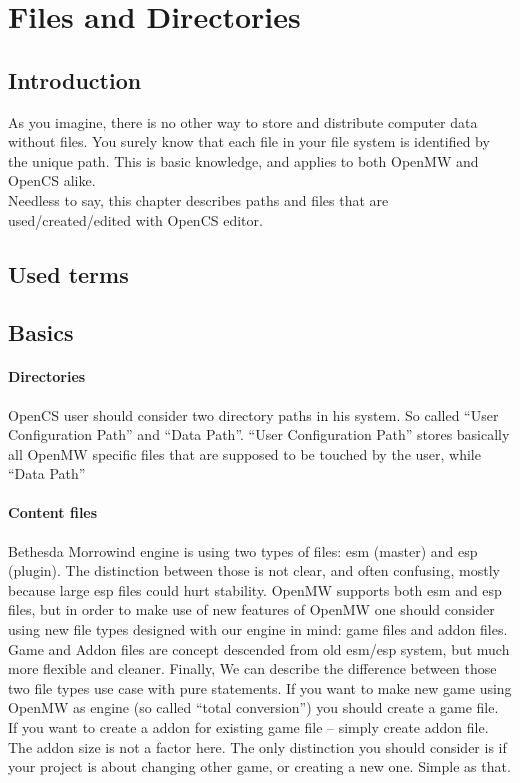 \section{Files and Directories}
\subsection{Introduction}
As you imagine, there is no other way to store and distribute computer data without files. You surely know that each file in your file system is identified by the unique path. This is basic knowledge, and applies to both Open{MW} and Open{CS} alike.\\

Needless to say, this chapter describes paths and files that are used/created/edited with OpenCS editor.\\

\subsection{Used terms} %

\subsection{Basics}

\paragraph{Directories}
Open{CS} user should consider two directory paths in his system. So called ``User Configuration Path'' and ``Data Path''. ``User Configuration Path'' stores basically all Open{MW} specific files that are supposed to be touched by the user, while ``Data Path''%

\paragraph{Content files}
Bethesda Morrowind engine is using two types of files: esm (master) and esp (plugin). The distinction between those is not clear, and often confusing, mostly because large esp files could hurt stability. Open{MW} supports both esm and esp files, but in order to make use of new features of OpenMW one should consider using new file types designed with our engine in mind: game files and addon files.\\

Game and Addon files are concept descended from old esm/esp system, but much more flexible and cleaner. Finally, We can describe the difference between those two file types use case with pure statements. If you want to make new game using Open{MW} as engine (so called ``total conversion'') you should create a game file. If you want to create a addon for existing game file -- simply create addon file. The addon size is not a factor here. The only distinction you should consider is if your project is about changing other game, or creating a new one. Simple as that.

